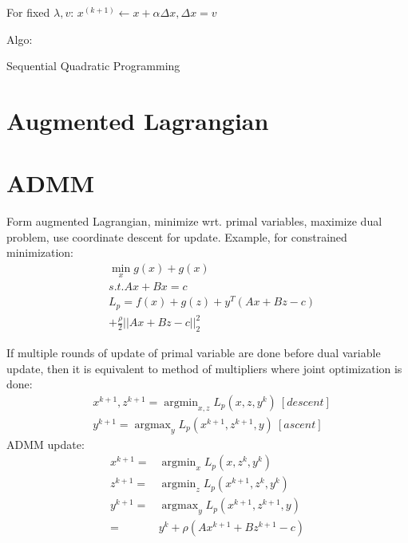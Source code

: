 \documentclass[8pt]{report}
\DeclareMathOperator*{\argmin}{argmin}
\DeclareMathOperator*{\argmax}{argmax}
\begin{document}
\begin{multicols*}{2}
  For fixed $\lambda, v$: $x^{(k+1)} \leftarrow x + \alpha \Delta x, \Delta x = v$
  
  Algo:\\
  \begin{algorithm}[H]
    \caption{Sequential Quadratic Programming\label{algo:SQP}}
  \end{algorithm}
  
  \vfill\null
  
  \pagebreak

  \section{Augmented Lagrangian}
  
  \section{ADMM}

  Form augmented Lagrangian, minimize wrt. primal variables, maximize dual problem, use coordinate descent for update. Example, for constrained minimization:
  \begin{align*}
    & \min_x g(x) + g(x)\\
    & s.t. Ax + Bx = c\\
    & L_p = f(x) + g(z) + y^T(Ax+Bz-c)\\
    & + \frac{\rho}{2} ||Ax+Bz-c||_2^2
  \end{align*}
  
  If multiple rounds of update of primal variable are done before dual variable update, then it is equivalent to method of multipliers where joint optimization is done:
  \begin{align*}
    &x^{k+1}, z^{k+1} = \argmin_{x,z} L_p(x,z,y^k)\ [descent]\\
    &y^{k+1} = \argmax_{y} L_p(x^{k+1},z^{k+1},y)\ [ascent]
  \end{align*}
  ADMM update:
  \begin{align*}
    x^{k+1} = & \argmin_{x} L_p(x,z^k,y^k)\\
    z^{k+1} = & \argmin_{z} L_p(x^{k+1},z^k,y^k)\\
    y^{k+1} = & \argmax_{y} L_p(x^{k+1},z^{k+1},y)\\
              = & y^k + \rho(Ax^{k+1} + Bz^{k+1} -c)
  \end{align*}


\end{multicols*}
\end{document}
